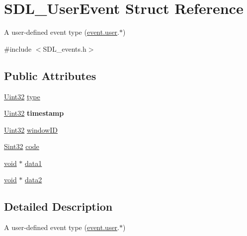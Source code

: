 \hypertarget{structSDL__UserEvent}{}\section{S\+D\+L\+\_\+\+User\+Event Struct Reference}
\label{structSDL__UserEvent}


A user-\/defined event type (\hyperlink{unionSDL__Event_ab7c394e3ce7bf1e4f8d68bc0e9f1b042}{event.\+user}.$\ast$)  




{\ttfamily \#include $<$S\+D\+L\+\_\+events.\+h$>$}

\subsection*{Public Attributes}
\begin{DoxyCompactItemize}
\item 
\hyperlink{SDL__stdinc_8h_add440eff171ea5f55cb00c4a9ab8672d}{Uint32} \hyperlink{structSDL__UserEvent_ab7afa8b98dbd7b52bef41155e10f7340}{type}
\item 
\hypertarget{structSDL__UserEvent_adbf1d34c73138a0c549310e5d4ad0c35}{}\hyperlink{SDL__stdinc_8h_add440eff171ea5f55cb00c4a9ab8672d}{Uint32} {\bfseries timestamp}\label{structSDL__UserEvent_adbf1d34c73138a0c549310e5d4ad0c35}

\item 
\hyperlink{SDL__stdinc_8h_add440eff171ea5f55cb00c4a9ab8672d}{Uint32} \hyperlink{structSDL__UserEvent_abccefa10e0e0e3a0801bc6d836a08da7}{window\+I\+D}
\item 
\hyperlink{SDL__stdinc_8h_a7a90b941db9d4582e9ad7abb9940ff7e}{Sint32} \hyperlink{structSDL__UserEvent_aef47976781ee82b527a353c5acfa0a34}{code}
\item 
\hyperlink{SDL__audio_8h_a52835ae37c4bb905b903cbaf5d04b05f}{void} $\ast$ \hyperlink{structSDL__UserEvent_ab2893a12be2f97195f16463a23107913}{data1}
\item 
\hyperlink{SDL__audio_8h_a52835ae37c4bb905b903cbaf5d04b05f}{void} $\ast$ \hyperlink{structSDL__UserEvent_aae4dbf65c34d654c9edf519eb061b7cf}{data2}
\end{DoxyCompactItemize}


\subsection{Detailed Description}
A user-\/defined event type (\hyperlink{unionSDL__Event_ab7c394e3ce7bf1e4f8d68bc0e9f1b042}{event.\+user}.$\ast$) 

